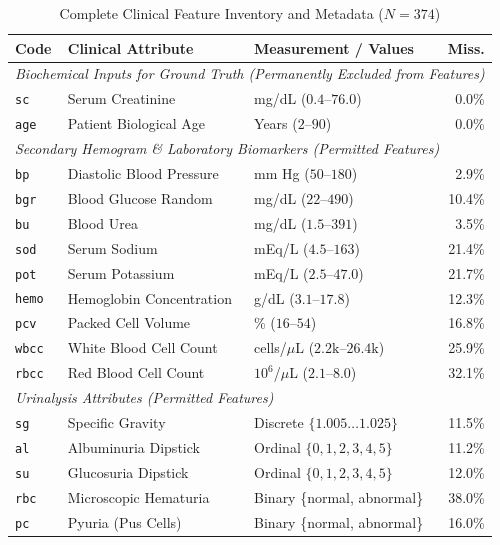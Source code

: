 \documentclass[conference]{IEEEtran}
\begin{document}
\begin{table}[htbp]
\centering
\caption{Complete Clinical Feature Inventory and Metadata ($N = 374$)}
\label{tab:feature_inventory}
\renewcommand{\arraystretch}{0.88}
\scriptsize
\begin{tabularx}{\columnwidth}{llp{2.3cm}r}
\toprule
\textbf{Code} & \textbf{Clinical Attribute} & \textbf{Measurement / Values} & \textbf{Miss.} \\
\midrule
\multicolumn{4}{l}{\textit{Biochemical Inputs for Ground Truth (Permanently Excluded from Features)}} \\
\texttt{sc} & Serum Creatinine & mg/dL ($0.4$--$76.0$) & 0.0\% \\
\texttt{age} & Patient Biological Age & Years ($2$--$90$) & 0.0\% \\
\midrule
\multicolumn{4}{l}{\textit{Secondary Hemogram \& Laboratory Biomarkers (Permitted Features)}} \\
\texttt{bp} & Diastolic Blood Pressure & mm Hg ($50$--$180$) & 2.9\% \\
\texttt{bgr} & Blood Glucose Random & mg/dL ($22$--$490$) & 10.4\% \\
\texttt{bu} & Blood Urea & mg/dL ($1.5$--$391$) & 3.5\% \\
\texttt{sod} & Serum Sodium & mEq/L ($4.5$--$163$) & 21.4\% \\
\texttt{pot} & Serum Potassium & mEq/L ($2.5$--$47.0$) & 21.7\% \\
\texttt{hemo} & Hemoglobin Concentration & g/dL ($3.1$--$17.8$) & 12.3\% \\
\texttt{pcv} & Packed Cell Volume & \% ($16$--$54$) & 16.8\% \\
\texttt{wbcc} & White Blood Cell Count & cells/$\mu$L ($2.2\text{k}$--$26.4\text{k}$) & 25.9\% \\
\texttt{rbcc} & Red Blood Cell Count & $10^6$/$\mu$L ($2.1$--$8.0$) & 32.1\% \\
\midrule
\multicolumn{4}{l}{\textit{Urinalysis Attributes (Permitted Features)}} \\
\texttt{sg} & Specific Gravity & Discrete $\{1.005 \dots 1.025\}$ & 11.5\% \\
\texttt{al} & Albuminuria Dipstick & Ordinal $\{0, 1, 2, 3, 4, 5\}$ & 11.2\% \\
\texttt{su} & Glucosuria Dipstick & Ordinal $\{0, 1, 2, 3, 4, 5\}$ & 12.0\% \\
\texttt{rbc} & Microscopic Hematuria & Binary \{normal, abnormal\} & 38.0\% \\
\texttt{pc} & Pyuria (Pus Cells) & Binary \{normal, abnormal\} & 16.0\% \\

\end{tabularx}
\end{table}
\end{document}
